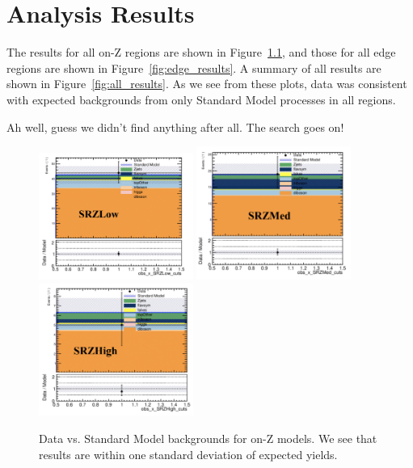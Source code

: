 \chapter{Analysis Results}

The results for all on-Z regions are shown in Figure~\ref{fig:on_Z_results}, and those for all edge regions are shown in Figure~\ref{fig:edge_results}. A summary of all results are shown in Figure~\ref{fig:all_results}. As we see from these plots, data was consistent with expected backgrounds from only Standard Model processes in all regions.

Ah well, guess we didn't find anything after all. The search goes on!

\begin{figure}[htbp]
    \centering
    \includegraphics[width=0.45\textwidth]{Images/SUSY/on_Z_low_results.png}
    \includegraphics[width=0.45\textwidth]{Images/SUSY/on_Z_med_results.png}
    \includegraphics[width=0.45\textwidth]{Images/SUSY/on_Z_high_results.png}
    \caption{Data vs. Standard Model backgrounds for on-Z models. We see that results are within one standard deviation of expected yields.}
    \label{fig:on_Z_results}
\end{figure}

